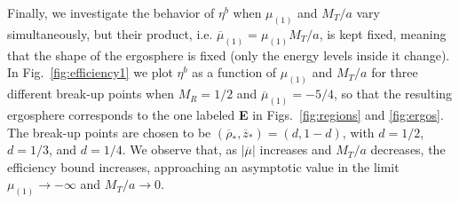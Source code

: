 Finally, we investigate the behavior of $\eta ^{b}$ when $\mu_{(1)}$ and $M_T/a$ vary simultaneously, but their product, i.e. $\overline \mu_{(1)} = \mu_{(1)} M_T/a$, is kept fixed, meaning that the shape of the ergosphere is fixed (only the energy levels inside it change). In Fig.~\ref{fig:efficiency1} we plot $\eta^b$ as a function of $\mu_{(1)}$ and $M_T/a$ for three different break-up points when $M_R=1/2$ and $\overline \mu_{(1)} = -5/4$, so that the resulting ergosphere corresponds to the one labeled \textbf{E} in Figs.~\ref{fig:regions} and \ref{fig:ergos}. The break-up points are chosen to be $(\overline \rho_*,\overline z_*)=(d,1-d)$, with $d=1/2$, $d=1/3$, and $d=1/4$. We observe that, as $|\overline {\mu}|$ increases and $M_T/a$ decreases, the efficiency bound increases, approaching an asymptotic value in the limit $\mu_{(1)} \rightarrow -\infty$ and $M_T/a \rightarrow 0$.





